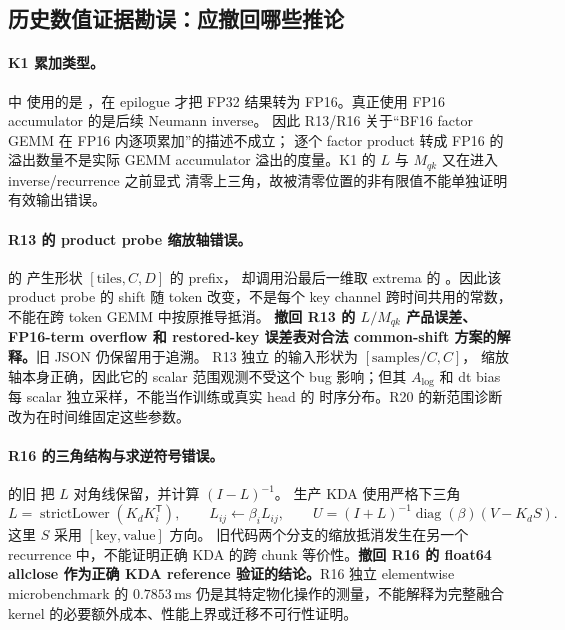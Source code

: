 \subsection{历史数值证据勘误：应撤回哪些推论}

\paragraph{K1 累加类型。}
 中
 使用的是
，在 epilogue 才把 FP32
结果转为 FP16。真正使用 FP16 accumulator 的是后续 Neumann inverse。
因此 R13/R16 关于“BF16 factor GEMM 在 FP16 内逐项累加”的描述不成立；
逐个 factor product 转成 FP16 的溢出数量不是实际 GEMM accumulator
溢出的度量。K1 的 $L$ 与 $M_{qk}$ 又在进入 inverse/recurrence 之前显式
清零上三角，故被清零位置的非有限值不能单独证明有效输出错误。

\paragraph{R13 的 product probe 缩放轴错误。}
 的
 产生形状 $[\mathrm{tiles},C,D]$ 的 prefix，
却调用沿最后一维取 extrema 的 。因此该 product
probe 的 shift 随 token 改变，不是每个 key channel 跨时间共用的常数，
不能在跨 token GEMM 中按原推导抵消。
\textbf{撤回 R13 的 $L/M_{qk}$ 产品误差、FP16-term overflow 和 restored-key
误差表对合法 common-shift 方案的解释。}旧 JSON 仍保留用于追溯。
R13 独立  的输入形状为 $[\mathrm{samples}/C,C]$，
缩放轴本身正确，因此它的 scalar 范围观测不受这个 bug 影响；但其
$A_{\log}$ 和 dt bias 每 scalar 独立采样，不能当作训练或真实 head 的
时序分布。R20 的新范围诊断改为在时间维固定这些参数。

\paragraph{R16 的三角结构与求逆符号错误。}
 的旧
 把 $L$ 对角线保留，并计算 $(I-L)^{-1}$。
生产 KDA 使用严格下三角
\[
 L=\operatorname{strictLower}(K_dK_i^{\mathsf T}),
 \qquad L_{ij}\leftarrow\beta_i L_{ij},
 \qquad U=(I+L)^{-1}\operatorname{diag}(\beta)(V-K_dS).
\]
这里 $S$ 采用 $[\mathrm{key},\mathrm{value}]$ 方向。
旧代码两个分支的缩放抵消发生在另一个 recurrence 中，不能证明正确
KDA 的跨 chunk 等价性。\textbf{撤回 R16 的 float64 allclose 作为正确
KDA reference 验证的结论。}R16 独立 elementwise microbenchmark 的
$0.7853\,\mathrm{ms}$ 仍是其特定物化操作的测量，不能解释为完整融合
kernel 的必要额外成本、性能上界或迁移不可行性证明。

